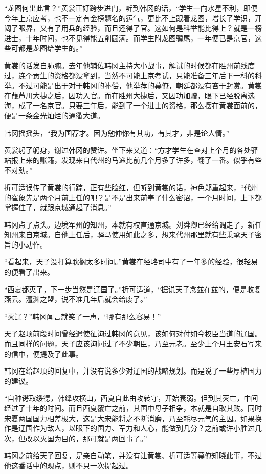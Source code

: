 “龙图何出此言？”黄裳正好跨步进门，听到韩冈的话，“学生一向水星不利，即便今年上京应考，也不一定有金榜题名的运气，更比不上跟着龙图，增长了学识，开阔了眼界，又有了用兵的经验，而且还得了官。这如何是科举能比得上？就是一榜进士，十年时间，也不见得能五削圆满。而学生附龙图骥尾，一年便已是京官，这些可都是龙图给学生的。”

黄裳的话发自肺腑。去年他辅佐韩冈主持大小战事，解试的时候都在胜州前线度过，连个贡生的资格都没拿到，当然不可能上京考试，只能准备三年后下一科的科举。不过可能是出于对于韩冈的补偿，他举荐的幕僚，朝廷都没有吝于封赏。黄裳在葭芦川大捷之后，因功入官。而在胜州大捷后，又因功加赠，眼下已经脱离选海，成了一名京官。只要三年后，能到了一个进士的资格，那么摆在黄裳面前的，便是一条金光灿烂的通衢大道。

韩冈摇摇头，“我为国荐才。因为勉仲你有其功，有其才，非是论人情。”

黄裳躬了躬身，谢过韩冈的赞许。坐下来又道：“方才学生在查对上个月的各处驿站报上来的账籍，发现来自代州的马递比前几个月多了许多，翻了一番。似乎有些不对劲。”

折可适误传了黄裳的行踪，正有些脸红，但听到黄裳的话，神色郑重起来，“代州的崔象先是两个月前上任的吧？是不是出来前奉了什么密诏，一个月时间，上下都掌握住了，就跟京城通起了消息。”

韩冈点了点头。边境军州的知州，本就有权直通京城。刘舜卿已经给调走了，新任知州来自京城。自他上任后，驿马使用如此之多，想来代州那里就有些秉承天子密旨的小动作。

“看起来，天子没打算耽搁太多时间。”黄裳在经略司中有了一年多的经验，很轻易的便看了出来。

“西夏都灭了，下一步当然是辽国了。”折可适道，“据说天子念兹在兹的，便是收复燕云。澶渊之盟，说不准几年后就会给废了。”

“灭辽？”韩冈闻言就笑了一声，“哪有那么容易！”

天子赵顼前段时间曾经遣使征询过韩冈的意见，该如何对付如今权臣当道的辽国。而且同样的问题，天子应该询问过了不少朝臣，乃至元老。至少上个月王安石写来的信中，便提及了此事。

韩冈在给赵顼的回复中，并没有说多少对辽国的战略规划。而是说了一些厚植国力的建议。

“自种谔取绥德，韩绛攻横山，西夏自此由攻转守，开始衰弱。但到其灭亡，中间经过了十年的时间。而且西夏覆亡之前，其国中母子相争，本就是自取其败。同时宋夏两国国力相差极大，这是大宋能将之不断消磨，乃至耗尽元气的主因。如果换作是辽国作为敌人，以眼下的国力、军力和人心，能做到几分？之前或许小胜过几次，但改以灭国为目的，那可就是两回事了。”

韩冈之前给天子回复，是亲自动笔，并没有让黄裳、折可适等幕僚知晓此事，不过他这番话中的观点，则不只一次提起过。

